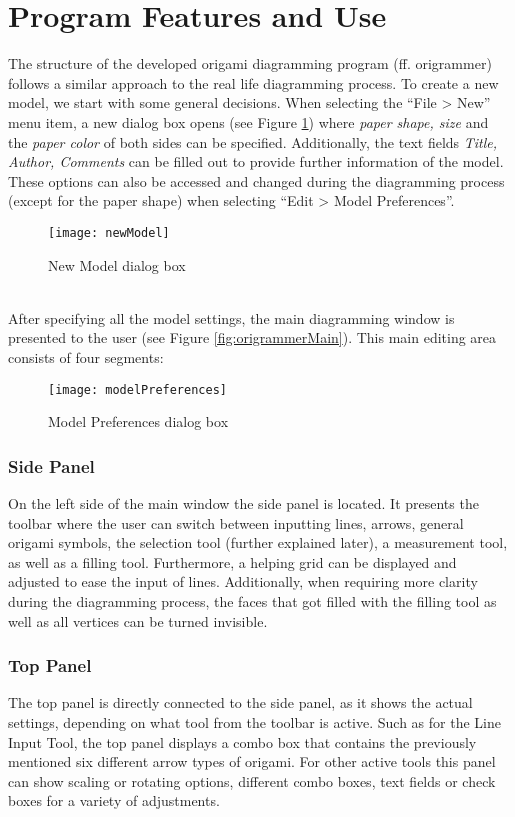 
\section{Program Features and Use}
\label{program}

The structure of the developed origami diagramming program (ff. \gls{origrammer}) follows a similar approach to the real life diagramming process. To create a new model, we start with some general decisions. When selecting the ``File > New'' menu item, a new dialog box opens (see Figure \ref{fig:newModel}) where \emph{paper shape, size} and the \emph{paper color} of both sides can be specified. Additionally, the text fields \emph{Title, Author, Comments} can be filled out to provide further information of the model. These options can also be accessed and changed during the diagramming process (except for the paper shape) when selecting ``Edit > Model Preferences''.
\begin{figure}[htbp]
	\centering
	\texttt{[image: newModel]}
	\caption{New Model dialog box}
	\label{fig:newModel}
\end{figure}\\
After specifying all the model settings, the main diagramming window is presented to the user (see Figure \ref{fig:origrammerMain}). This main editing area consists of four segments:\\
\begin{figure}[htbp]
	\centering
	\texttt{[image: modelPreferences]}
	\caption{Model Preferences dialog box}
	\label{fig:modelPreferences}
\end{figure}

\subsubsection*{Side Panel}
On the left side of the main window the side panel is located. It presents the toolbar where the user can switch between inputting lines, arrows, general origami symbols, the selection tool (further explained later), a measurement tool, as well as a filling tool. Furthermore, a helping grid can be displayed and adjusted to ease the input of lines. Additionally, when requiring more clarity during the diagramming process, the faces that got filled with the filling tool as well as all vertices can be turned invisible.

\subsubsection*{Top Panel}
The top panel is directly connected to the side panel, as it shows the actual settings, depending on what tool from the toolbar is active. Such as for the Line Input Tool, the top panel displays a combo box that contains the previously mentioned six different arrow types of origami. For other active tools this panel can show scaling or rotating options, different combo boxes, text fields or check boxes for a variety of adjustments.


